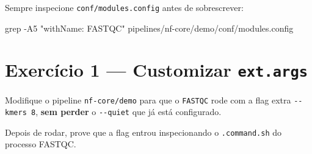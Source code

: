 \documentclass[
  brazilian,
  letterpaper,
  DIV=11,
  numbers=noendperiod]{scrreprt}
\newenvironment{Shaded}{\begin{snugshade}}{\end{snugshade}}
\newcommand{\AttributeTok}[1]{\textcolor[rgb]{0.40,0.45,0.13}{#1}}
\newcommand{\FunctionTok}[1]{\textcolor[rgb]{0.28,0.35,0.67}{#1}}
\newcommand{\NormalTok}[1]{\textcolor[rgb]{0.00,0.23,0.31}{#1}}
\newcommand{\StringTok}[1]{\textcolor[rgb]{0.13,0.47,0.30}{#1}}
\begin{document}
Sempre inspecione \texttt{conf/modules.config} antes de sobrescrever:

\begin{Shaded}
\begin{Highlighting}[]
\FunctionTok{grep} \AttributeTok{{-}A5} \StringTok{"withName: FASTQC"}\NormalTok{ pipelines/nf{-}core/demo/conf/modules.config}
\end{Highlighting}
\end{Shaded}

\section{\texorpdfstring{Exercício 1 --- Customizar
\texttt{ext.args}}{Exercício 1 --- Customizar ext.args}}\label{exercuxedcio-1-customizar-ext.args}

\begin{tcolorbox}[enhanced jigsaw, arc=.35mm, bottomrule=.15mm, bottomtitle=1mm, breakable, colback=white, colbacktitle=quarto-callout-note-color!10!white, colframe=quarto-callout-note-color-frame, coltitle=black, left=2mm, leftrule=.75mm, opacityback=0, opacitybacktitle=0.6, rightrule=.15mm, title=\textcolor{quarto-callout-note-color}{\faInfo}\hspace{0.5em}{Enunciado}, titlerule=0mm, toprule=.15mm, toptitle=1mm]

Modifique o pipeline \texttt{nf-core/demo} para que o \texttt{FASTQC}
rode com a flag extra \texttt{-\/-kmers\ 8}, \textbf{sem perder} o
\texttt{-\/-quiet} que já está configurado.

Depois de rodar, prove que a flag entrou inspecionando o
\texttt{.command.sh} do processo FASTQC.

\end{tcolorbox}
\end{document}
